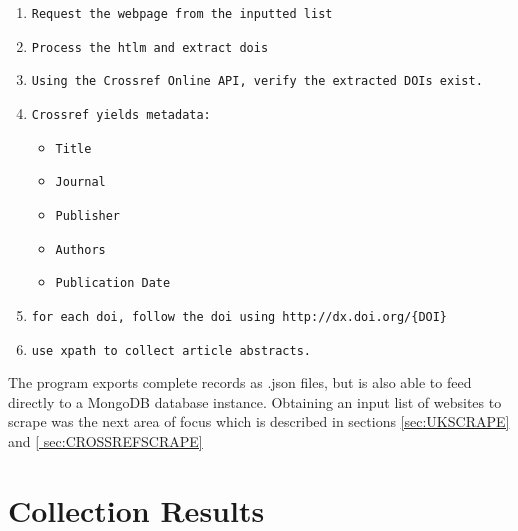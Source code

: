 \begin{sloppypar}
\begin{enumerate}
\item \texttt{Request the webpage from the inputted list}
\item \texttt{Process the htlm and extract dois}
\item \texttt{Using the Crossref Online API, verify the extracted DOIs exist.}
\item \texttt{Crossref yields metadata:}
\begin{itemize}
\item \texttt{Title}
\item \texttt{Journal}
\item \texttt{Publisher}
\item \texttt{Authors}
\item \texttt{Publication Date}
\end{itemize}
\item \texttt{for each doi, follow the doi using \texttt{http://dx.doi.org/\{DOI\}}}
\item \texttt{use xpath to collect article abstracts.}
\end{enumerate}
\end{sloppypar}
The program exports complete records as .json files, but is also able to feed directly to a MongoDB database instance. Obtaining an input list of websites to scrape was the next area of focus which is described in sections \ref{sec:UKSCRAPE} and \ref{ sec:CROSSREFSCRAPE} 
\section{Collection Results}
